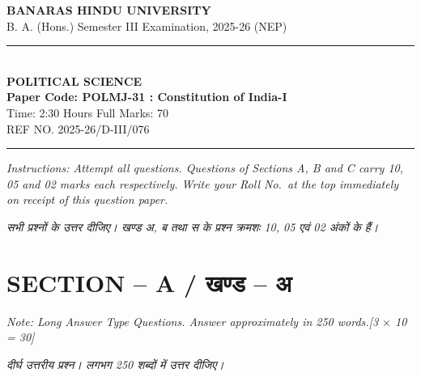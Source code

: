 \documentclass[11pt,a4paper]{article}
\newcommand{\pts}[1]{\hfill \textit{[#1]}}
\begin{document}
\begin{center}
  {\large\bfseries BANARAS HINDU UNIVERSITY}\\[2pt]
  {\normalsize B. A. (Hons.) Semester III Examination, 2025-26 (NEP)}\\[6pt]
  \rule{0.8\linewidth}{0.5pt}\\[6pt]
  {\large\bfseries POLITICAL SCIENCE}\\[4pt]
  {\large\bfseries Paper Code: POLMJ-31 : Constitution of India-I}\\[4pt]
  {\normalsize Time: 2:30 Hours \hfill Full Marks: 70}\\[2pt]
  {\small REF NO. 2025-26/D-III/076}
\end{center}
\rule{\linewidth}{0.4pt}
\smallskip

\noindent \textit{Instructions: Attempt all questions. Questions of Sections A, B and C carry 10, 05 and 02 marks each respectively. Write your Roll No.\ at the top immediately on receipt of this question paper.}

\smallskip
\noindent \textit{सभी प्रश्नों के उत्तर दीजिए। खण्ड अ, ब तथा स के प्रश्न क्रमशः 10, 05 एवं 02 अंकों के हैं।}

\bigskip

\section*{SECTION -- A / खण्ड -- अ}
\noindent \textit{Note: Long Answer Type Questions. Answer approximately in 250 words.}\pts{3 $\times$ 10 = 30}

\noindent \textit{दीर्घ उत्तरीय प्रश्न। लगभग 250 शब्दों में उत्तर दीजिए।}
\end{document}
